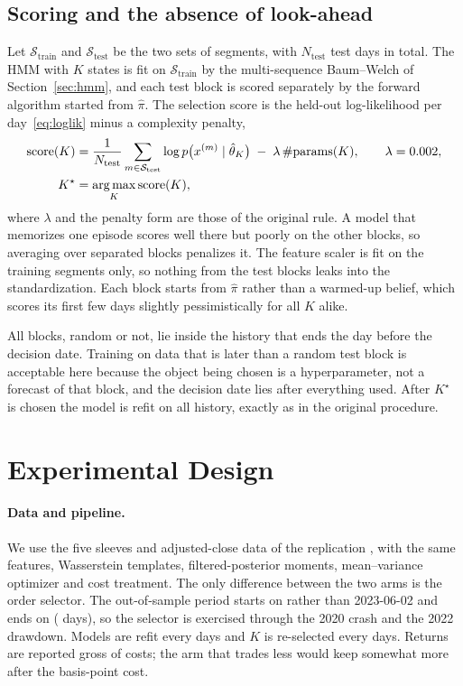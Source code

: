 \documentclass[11pt]{article}
\DeclareMathOperator*{\argmax}{arg\,max}
\begin{document}
\subsection{Scoring and the absence of look-ahead}

Let $\mathcal S_{\text{train}}$ and $\mathcal S_{\text{test}}$ be the two sets of segments, with $N_{\text{test}}$ test days in total. The HMM with $K$ states is fit on $\mathcal S_{\text{train}}$ by the multi-sequence Baum--Welch of Section~\ref{sec:hmm}, and each test block is scored separately by the forward algorithm started from $\hat\pi$. The selection score is the held-out log-likelihood per day~\eqref{eq:loglik} minus a complexity penalty,
\begin{equation}
\begin{aligned}
\operatorname{score}(K)&=\frac{1}{N_{\text{test}}}\sum_{m\in\mathcal S_{\text{test}}}\log p\bigl(x^{(m)}\mid\hat\theta_K\bigr)\;-\;\lambda\,\#\mathrm{params}(K),
\qquad \lambda=\ComplexityPenalty{},\\
K^\star&=\argmax_{K}\operatorname{score}(K),
\end{aligned}
\end{equation}
where $\lambda$ and the penalty form are those of the original rule. A model that memorizes one episode scores well there but poorly on the other blocks, so averaging over separated blocks penalizes it. The feature scaler is fit on the training segments only, so nothing from the test blocks leaks into the standardization. Each block starts from $\hat\pi$ rather than a warmed-up belief, which scores its first few days slightly pessimistically for all $K$ alike.

All blocks, random or not, lie inside the history that ends the day before the decision date. Training on data that is later than a random test block is acceptable here because the object being chosen is a hyperparameter, not a forecast of that block, and the decision date lies after everything used. After $K^\star$ is chosen the model is refit on all history, exactly as in the original procedure.

\section{Experimental Design}\label{sec:design}

\paragraph{Data and pipeline.} We use the five sleeves and adjusted-close data of the replication \cite{replicationpaper}, with the same features, Wasserstein templates, filtered-posterior moments, mean--variance optimizer and cost treatment. The only difference between the two arms is the order selector. The out-of-sample period starts on \OOSStart{} rather than 2023-06-02 and ends on \OOSEnd{} (\OOSObs{} days), so the selector is exercised through the 2020 crash and the 2022 drawdown. Models are refit every \RefitFrequency{} days and $K$ is re-selected every \OrderFrequency{} days. Returns are reported gross of costs; the arm that trades less would keep somewhat more after the \CostBps{} basis-point cost.
\end{document}
